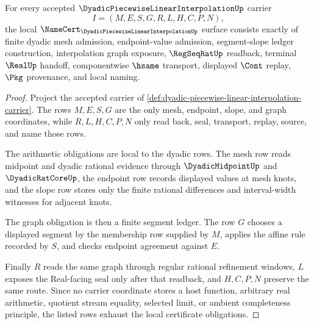 \begin{theorem}
\label{thm:dyadic-piecewise-linear-interpolation-namecert-obligations}
For every accepted $\DyadicPiecewiseLinearInterpolationUp$ carrier
$$
I=(M,E,S,G,R,L,H,C,P,N),
$$
the local $\NameCert_{\DyadicPiecewiseLinearInterpolationUp}$ surface consists exactly of finite dyadic mesh admission, endpoint-value admission, segment-slope ledger construction, interpolation graph exposure, $\RegSeqRatUp$ readback, terminal $\RealUp$ handoff, componentwise $\hsame$ transport, displayed $\Cont$ replay, $\Pkg$ provenance, and local naming.
\end{theorem}
\begin{proof}
Project the accepted carrier of \autoref{def:dyadic-piecewise-linear-interpolation-carrier}. The rows $M,E,S,G$ are the only mesh, endpoint, slope, and graph coordinates, while $R,L,H,C,P,N$ only read back, seal, transport, replay, source, and name those rows.

The arithmetic obligations are local to the dyadic rows. The mesh row reads midpoint and dyadic rational evidence through $\DyadicMidpointUp$ and $\DyadicRatCoreUp$, the endpoint row records displayed values at mesh knots, and the slope row stores only the finite rational differences and interval-width witnesses for adjacent knots.

The graph obligation is then a finite segment ledger. The row $G$ chooses a displayed segment by the membership row supplied by $M$, applies the affine rule recorded by $S$, and checks endpoint agreement against $E$.

Finally $R$ reads the same graph through regular rational refinement windows, $L$ exposes the Real-facing seal only after that readback, and $H,C,P,N$ preserve the same route. Since no carrier coordinate stores a host function, arbitrary real arithmetic, quotient stream equality, selected limit, or ambient completeness principle, the listed rows exhaust the local certificate obligations.
\end{proof}

